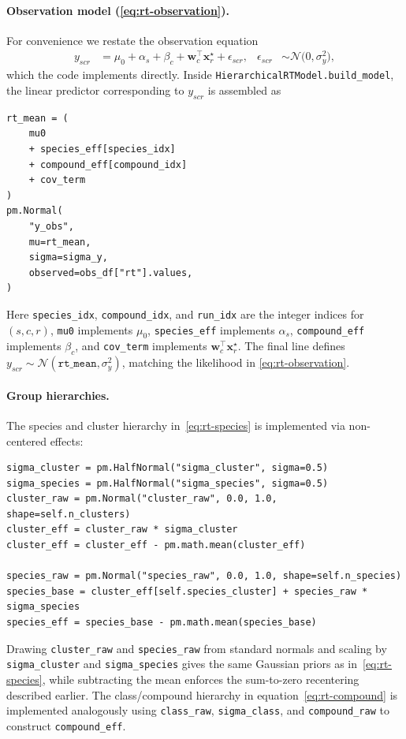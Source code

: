 \documentclass[11pt]{article}
\begin{document}
\paragraph{Observation model \texorpdfstring{(\eqref{eq:rt-observation})}{(2.1)}.}
For convenience we restate the observation equation
\begin{align*}
  y_{scr}
  &=
  \mu_0
  +
  \alpha_{s}
  +
  \beta_{c}
  +
  \bm{w}_{c}^{\top}\bm{x}^{\star}_{r}
  +
  \epsilon_{scr},
  &
  \epsilon_{scr} &\sim\mathcal{N}\!\bigl(0,\sigma_y^2\bigr),
\end{align*}
which the code implements directly. Inside \texttt{HierarchicalRTModel.build\_model},
the linear predictor corresponding to $y_{scr}$ is assembled as
\begin{verbatim}
rt_mean = (
    mu0
    + species_eff[species_idx]
    + compound_eff[compound_idx]
    + cov_term
)
pm.Normal(
    "y_obs",
    mu=rt_mean,
    sigma=sigma_y,
    observed=obs_df["rt"].values,
)
\end{verbatim}
Here \texttt{species\_idx}, \texttt{compound\_idx}, and \texttt{run\_idx} are the
integer indices for $(s,c,r)$, \texttt{mu0} implements $\mu_0$, \texttt{species\_eff}
implements $\alpha_s$, \texttt{compound\_eff} implements $\beta_c$, and \texttt{cov\_term}
implements $\bm{w}_c^{\top}\bm{x}^{\star}_r$. The final line defines
$y_{scr}\sim\mathcal{N}(\texttt{rt\_mean},\sigma_y^2)$, matching the likelihood in
\eqref{eq:rt-observation}.

\paragraph{Group hierarchies.}
The species and cluster hierarchy in~\eqref{eq:rt-species} is implemented via
non-centered effects:
\begin{verbatim}
sigma_cluster = pm.HalfNormal("sigma_cluster", sigma=0.5)
sigma_species = pm.HalfNormal("sigma_species", sigma=0.5)
cluster_raw = pm.Normal("cluster_raw", 0.0, 1.0, shape=self.n_clusters)
cluster_eff = cluster_raw * sigma_cluster
cluster_eff = cluster_eff - pm.math.mean(cluster_eff)

species_raw = pm.Normal("species_raw", 0.0, 1.0, shape=self.n_species)
species_base = cluster_eff[self.species_cluster] + species_raw * sigma_species
species_eff = species_base - pm.math.mean(species_base)
\end{verbatim}
Drawing \texttt{cluster\_raw} and \texttt{species\_raw} from standard normals and
scaling by \texttt{sigma\_cluster} and \texttt{sigma\_species} gives the same
Gaussian priors as in~\eqref{eq:rt-species}, while subtracting the mean enforces the
sum-to-zero recentering described earlier. The class/compound hierarchy in
equation~\eqref{eq:rt-compound} is implemented analogously using
\texttt{class\_raw}, \texttt{sigma\_class}, and \texttt{compound\_raw} to construct
\texttt{compound\_eff}.
\end{document}

